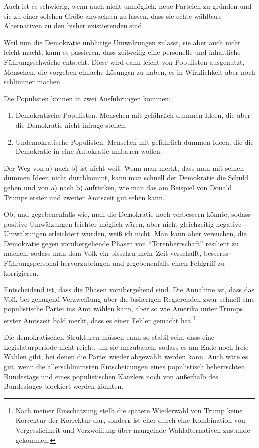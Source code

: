 Auch ist es schwierig, wenn auch nicht unmöglich, neue Parteien zu gründen und sie zu einer solchen Größe anwachsen zu lassen, dass sie echte wählbare Alternativen zu den bisher existierenden sind.

Weil nun die Demokratie unblutige Umwälzungen zulässt, sie aber auch nicht leicht macht, kann es passieren, dass zeitweilig eine personelle und inhaltliche Führungsschwäche entsteht.
Diese wird dann leicht von Populisten ausgenutzt, Menschen, die vorgeben einfache Lösungen zu haben, es in Wirklichkeit aber noch schlimmer machen.

Die Populisten können in zwei Ausführungen kommen:
\begin{enumerate}[label=\alph*)]
    \item Demokratische Populisten. Menschen mit gefährlich dummen Ideen, die aber die Demokratie nicht infrage stellen.
    \item Undemokratische Populisten. Menschen mit gefährlich dummen Ideen, die die Demokratie in eine Autokratie umbauen wollen.
\end{enumerate}

Der Weg von a) nach b) ist nicht weit.
Wenn man merkt, dass man mit seinen dummen Ideen nicht durchkommt, kann man schnell der Demokratie die Schuld geben und von a) nach b) aufrücken, wie man das am Beispiel von Donald Trumps erster und zweiter Amtszeit gut sehen kann.

Ob, und gegebenenfalls wie, man die Demokratie noch verbessern könnte, sodass positive Umwälzungen leichter möglich wären, aber nicht gleichzeitig negative Umwälzungen erleichtert würden, weiß ich nicht.
Man kann aber versuchen, die Demokratie gegen vorübergehende Phasen von \enquote{Torenherrschaft} resilient zu machen, sodass man dem Volk ein bisschen mehr Zeit verschafft, besseres Führungspersonal hervorzubringen und gegebenenfalls einen Fehlgriff zu korrigieren.

Entscheidend ist, dass die Phasen vorübergehend sind.
Die Annahme ist, dass das Volk bei genügend Verzweiflung über die bisherigen Regierenden zwar schnell eine populistische Partei ins Amt wählen kann, aber so wie Amerika unter Trumps erster Amtszeit bald merkt, dass es einen Fehler gemacht hat.\footnote{Nach meiner Einschätzung stellt die spätere Wiederwahl von Trump keine Korrektur der Korrektur dar, sondern ist eher durch eine Kombination von Vergesslichkeit und Verzweiflung über mangelnde Wahlalternativen zustande gekommen.}

Die demokratischen Strukturen müssen dann so stabil sein, dass eine Legislaturperiode nicht reicht, um sie umzubauen, sodass es am Ende noch freie Wahlen gibt, bei denen die Partei wieder abgewählt werden kann.
Auch wäre es gut, wenn die allerschlimmsten Entscheidungen eines populistisch beherrschten Bundestags und eines populistischen Kanzlers noch von außerhalb des Bundestages blockiert werden könnten.

